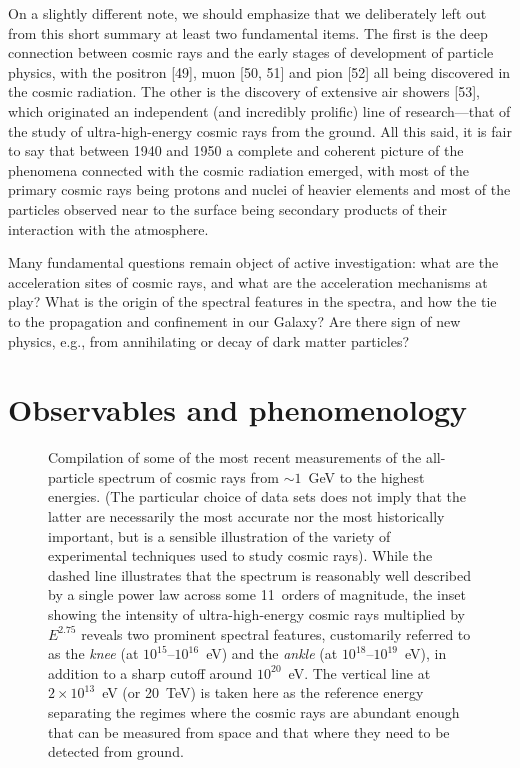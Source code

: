 On a slightly different note, we should emphasize that we deliberately left out from
this short summary at least two fundamental items. The first is the deep connection
between cosmic rays and the early stages of development of particle physics, with
the positron [49], muon [50, 51] and pion [52] all being discovered in the cosmic
radiation. The other is the discovery of extensive air showers [53], which originated
an independent (and incredibly prolific) line of research---that of the study of
ultra-high-energy cosmic rays from the ground. All this said, it is fair to say that
between 1940 and 1950 a complete and coherent picture of the phenomena connected
with the cosmic radiation emerged, with most of the primary cosmic rays being protons
and nuclei of heavier elements and most of the particles observed near to the surface
being secondary products of their interaction with the atmosphere.

Many fundamental questions remain object of active investigation: what are the acceleration
sites of cosmic rays, and what are the acceleration mechanisms at play? What is the
origin of the spectral features in the spectra, and how the tie to the propagation
and confinement in our Galaxy? Are there sign of new physics, e.g., from annihilating
or decay of dark matter particles?



\section{Observables and phenomenology}


\begin{figure}[!htbp]
  
  \caption{Compilation of some of the most recent measurements of the all-particle
    spectrum of cosmic rays from $\sim 1$~GeV to the highest energies.
    (The particular choice of data sets does not imply that the latter are necessarily
    the most accurate nor the most historically important, but is a sensible
    illustration of the variety of experimental techniques used to study cosmic rays).
    While the dashed line illustrates that the spectrum is reasonably well described
    by a single power law across some 11~orders of magnitude, the inset showing the
    intensity of ultra-high-energy cosmic rays multiplied by $E^{2.75}$ reveals
    two prominent spectral features, customarily referred to as the \emph{knee}
    (at $10^{15}$--$10^{16}$~eV) and the \emph{ankle} (at $10^{18}$--$10^{19}$~eV),
    in addition to a sharp cutoff around $10^{20}$~eV. The vertical line at
    $2 \times 10^{13}$~eV (or 20~TeV) is taken here as the reference energy separating
    the regimes where the cosmic rays are abundant enough that can be measured from
    space and that where they need to be detected from ground.}
  \label{fig:cr_intensity}
\end{figure}

